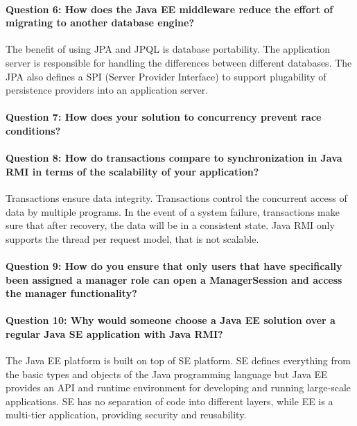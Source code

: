 \documentclass{ds-report}
\begin{document}
	\paragraph{Question 6: How does the Java EE middleware reduce the effort of migrating to another database engine?\\} 
		The benefit of using JPA and JPQL is database portability. The application server is responsible for handling the differences between different databases. The JPA also defines a SPI (Server Provider Interface) to support plugability of persistence providers into an application server.
		
	\paragraph{Question 7: How does your solution to concurrency prevent race conditions?\\} 
	
	\paragraph{Question 8: How do transactions compare to synchronization in Java RMI in terms of the scalability of your application?\\} 
	Transactions ensure data integrity. Transactions control the concurrent access of data by multiple programs. In the event of a system failure, transactions make sure that after recovery, the data will be in a consistent state. Java RMI only supports the thread per request model, that is not scalable.
	
	\paragraph{Question 9: How do you ensure that only users that have specifically been assigned a manager role can open a ManagerSession and access the manager functionality?\\} 
	
	\paragraph{Question 10: Why would someone choose a Java EE solution over a regular Java SE application with Java RMI?\\} 
	The Java EE platform is built on top of SE platform. SE defines everything from the basic types and objects of the Java programming language but Java EE provides an API and runtime environment for developing and running large-scale applications. SE has no separation of code into different layers, while EE is a multi-tier application, providing security and reusability.
	\clearpage
	
	
\end{document}

